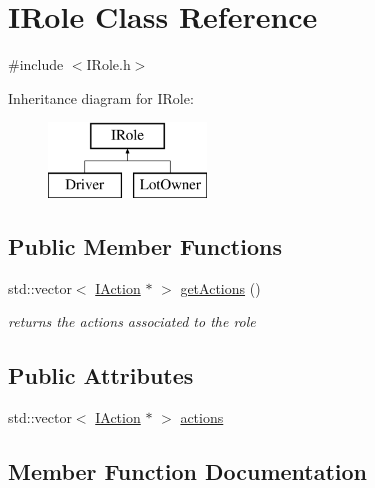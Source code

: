 \hypertarget{class_i_role}{}\section{I\+Role Class Reference}
\label{class_i_role}


{\ttfamily \#include $<$I\+Role.\+h$>$}

Inheritance diagram for I\+Role\+:\begin{figure}[H]
\begin{center}
\leavevmode
\includegraphics[height=2.000000cm]{class_i_role}
\end{center}
\end{figure}
\subsection*{Public Member Functions}
\begin{DoxyCompactItemize}
\item 
std\+::vector$<$ \mbox{\hyperlink{class_i_action}{I\+Action}} $\ast$ $>$ \mbox{\hyperlink{class_i_role_ae3521dd7cb87c6e9e530605fb66649f7}{get\+Actions}} ()
\begin{DoxyCompactList}\small\item\em returns the actions associated to the role \end{DoxyCompactList}\end{DoxyCompactItemize}
\subsection*{Public Attributes}
\begin{DoxyCompactItemize}
\item 
std\+::vector$<$ \mbox{\hyperlink{class_i_action}{I\+Action}} $\ast$ $>$ \mbox{\hyperlink{class_i_role_a2ce1e0f3b3e449ee8213cb23daf8411e}{actions}}
\end{DoxyCompactItemize}


\subsection{Member Function Documentation}
\mbox{\label{class_i_role_ae3521dd7cb87c6e9e530605fb66649f7}} 
